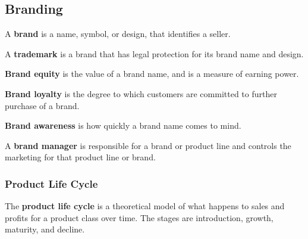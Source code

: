 \documentclass[english, 12pt]{article}
\begin{document}
\subsection{Branding}
\begin{defn}
A \textbf{brand} is a name, symbol, or design, that identifies a seller.
\end{defn}
\begin{defn}
A \textbf{trademark} is a brand that has legal protection for its brand name and design.
\end{defn}
\begin{defn}
\textbf{Brand equity} is the value of a brand name, and is a measure of earning power.
\end{defn}
\begin{defn}
\textbf{Brand loyalty} is the degree to which customers are committed to further purchase of a brand.
\end{defn}
\begin{defn}
\textbf{Brand awareness} is how quickly a brand name comes to mind.
\end{defn}
\begin{defn}
A \textbf{brand manager} is responsible for a brand or product line and controls the marketing for that product line or brand.
\end{defn}
\subsubsection*{Product Life Cycle}
\begin{defn}
The \textbf{product life cycle} is a theoretical model of what happens to sales and profits for a product class over time. The stages are introduction, growth, maturity, and decline.
\end{defn}
\end{document}
